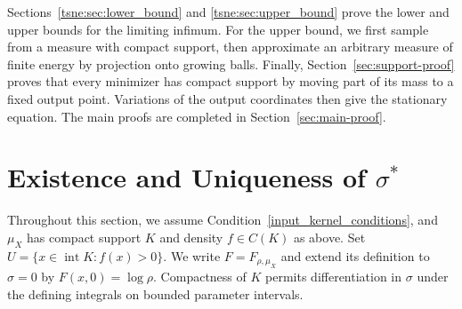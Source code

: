Sections~\ref{tsne:sec:lower_bound} and \ref{tsne:sec:upper_bound} prove the lower and upper bounds for the limiting infimum. For the upper bound, we first sample from a measure with compact support, then approximate an arbitrary measure of finite energy by projection onto growing balls. Finally, Section~\ref{sec:support-proof} proves that every minimizer has compact support by moving part of its mass to a fixed output point. Variations of the output coordinates then give the stationary equation. The main proofs are completed in Section~\ref{sec:main-proof}.

\section{Existence and Uniqueness of \texorpdfstring{$\sigma^*$}{sigma-star}}\label{tsne:sec:existence_uniqueness}
Throughout this section, we assume Condition~\ref{input_kernel_conditions}, and $\mu_X$ has compact support $K$ and density $f\in C(K)$ as above. Set $U=\{x\in\operatorname{int}K:f(x)>0\}$. We write $F=F_{\rho,\mu_X}$ and extend its definition to $\sigma=0$ by $F(x,0)=\log\rho$. Compactness of $K$ permits differentiation in $\sigma$ under the defining integrals on bounded parameter intervals.

